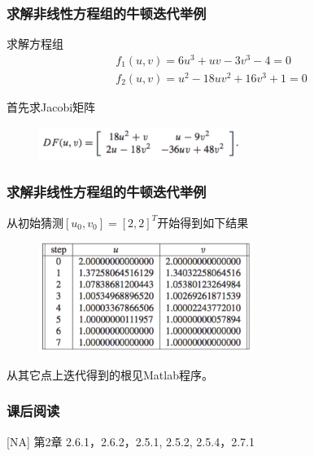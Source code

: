 \documentclass[10pt]{beamer}
\begin{document}
\begin{frame}
\frametitle{求解非线性方程组的牛顿迭代举例}
\begin{example}
求解方程组
\begin{align}
f_1(u,v) = 6u^3 + uv - 3v^3 - 4= 0 \nonumber \\
f_2(u,v) = u^2 - 18uv^2 + 16v^3 + 1 = 0
\end{align}
\end{example}
首先求Jacobi矩阵
\begin{figure}
\includegraphics[width=6.5cm]{figs/2_6_Nonlinear-Examp-1-6} 
\end{figure}
\end{frame}


\begin{frame}
\frametitle{求解非线性方程组的牛顿迭代举例}
从初始猜测$[u_0, v_0] = [2,2]^T$开始得到如下结果
\begin{figure}
\includegraphics[width=7cm]{figs/2_6_Nonlinear-Examp-1-7} 
\end{figure}
从其它点上迭代得到的根见Matlab程序。
\end{frame}


\begin{frame}
\frametitle{课后阅读}
[NA] 第2章 2.6.1，2.6.2，2.5.1, 2.5.2, 2.5.4，2.7.1


\end{frame}
\end{document}
